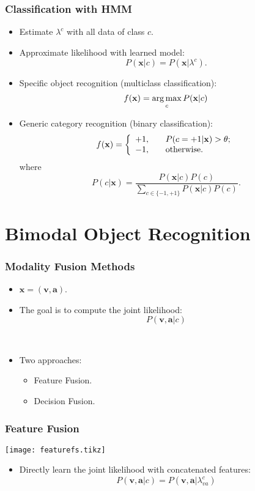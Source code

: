 \documentclass{beamer}
\begin{document}
\begin{frame}
  \frametitle{Classification with HMM}

  \begin{itemize}
    \item Estimate $\lambda^c$ with all data of class $c$.
    \item Approximate likelihood with learned model:
      \[ P(\mathbf{x}|c) = P(\mathbf{x}|\lambda^c) . \]
    \item Specific object recognition (multiclass classification):
      \[ f(\mathbf{x}) = \operatorname*{arg\,max}_{c} P(\mathbf{x}|c) \]
    \item Generic category recognition (binary classification):
      \[ 
        f(\mathbf{x}) = \left\{
          \begin{array}{l l}
            +1, & \quad P(c=+1|\mathbf{x}) > \theta; \\
            -1, & \quad \text{otherwise.}
          \end{array} \right.
        \]
        where
        \[ P(c|\mathbf{x}) = \frac{P(\mathbf{x}|c)P(c)}{\sum_{c \in \{-1,+1\}} P(\mathbf{x}|c)P(c)} . \]
    \end{itemize}
  \end{frame}

  \section{Bimodal Object Recognition}
  \begin{frame}
    \frametitle{Modality Fusion Methods}

    \begin{itemize}
      \item $\mathbf{x} = (\mathbf{v},\mathbf{a})$.
      \item The goal is to compute the joint likelihood:
        \[ P(\mathbf{v},\mathbf{a}|c) \]

        ~
      \item Two approaches:
        \begin{itemize}
          \item Feature Fusion.
          \item Decision Fusion.
        \end{itemize}
    \end{itemize}
  \end{frame}

  \begin{frame}
    \frametitle{Feature Fusion}

    \centering
    \texttt{[image: featurefs.tikz]}

    \begin{itemize}
      \item Directly learn the joint likelihood with concatenated features:
        \[ P(\mathbf{v},\mathbf{a}|c) = P(\mathbf{v},\mathbf{a}|\lambda_{va}^c) \]
    \end{itemize}
  \end{frame}
\end{document}

